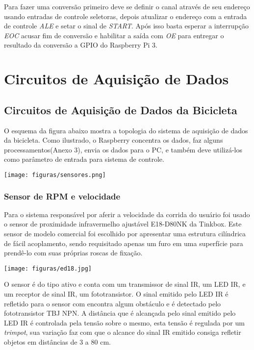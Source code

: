 	Para fazer uma conversão primeiro deve se definir o canal através de seu endereço usando entradas de controle seletoras, depois atualizar o endereço com a entrada de controle \textit{ALE} e setar o sinal de \textit{START}. Após isso basta esperar a interrupção \textit{EOC} acusar fim de conversão e habilitar a saída com \textit{OE} para entregar o resultado da conversão a GPIO do Raspberry Pi 3.

\section{Circuitos de Aquisição de Dados}


\subsection{Circuitos de Aquisição de Dados da Bicicleta}

O esquema da figura abaixo mostra a topologia do sistema de aquisição de dados da bicicleta.  Como ilustrado, o Raspberry  concentra os dados, faz alguns processamentos(Anexo 3), envia os dados para o PC,  e também deve utilizá-los como parâmetro de entrada para sistema de controle.
            \begin{center}
   	\texttt{[image: figuras/sensores.png]}
        \label{sensores}
   \end{center}


\subsubsection{Sensor de RPM e velocidade}

		Para o sistema responsável por aferir a velocidade da corrida do usuário foi usado o sensor de proximidade infravermelho ajustável E18-D80NK da Tinkbox. Este sensor de modelo comercial foi escolhido por apresentar uma estrutura cilíndrica de fácil acoplamento, sendo requisitado apenas um furo em uma superfície para prendê-lo com suas próprias roscas de fixação.

            \begin{center}
    	\texttt{[image: figuras/ed18.jpg]}
        \label{ir_model}
    \end{center}

	O sensor é do tipo ativo e conta com um transmissor de sinal IR, um LED IR, e um receptor de sinal IR, um fototransistor. O sinal emitido pelo LED IR é refletido para o sensor com encontra algum obstáculo e é detectado pelo fototransistor TBJ NPN. A distância que é alcançada pelo sinal emitido pelo LED IR é controlada pela tensão sobre o mesmo, esta tensão é regulada por um \textit{trimpot}, sua variação faz com que o alcance do sinal IR emitido consiga refletir objetos em distâncias de 3 a 80 cm.

